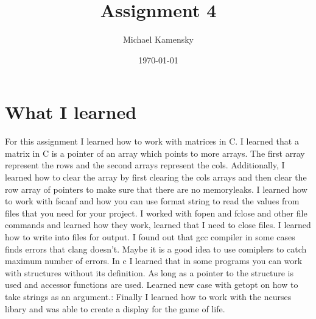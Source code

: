 \documentclass[11pt]{article} %
\title{Assignment 4}
\author{Michael Kamensky}
\date{\today} %
\begin{document}
\maketitle %
\section{What I learned}
For this assignment I learned how to work with matrices in C.
I learned that a matrix in C is a pointer of an array which points to more arrays. The first array represent the rows and the second arrays represent the cols.
Additionally, I learned how to clear the array by first clearing the cols arrays and then clear the row array of pointers to make sure that there are no memoryleaks.
I learned how to work with fscanf and how you can use format string to read the values from files that you need for your project.
I worked with fopen and fclose and other file commands and learned how they work, learned that I need to close files.
I learned how to write into files for output.
I found out that gcc compiler in some cases finds errors that clang doesn't. Maybe it is a good idea to use comiplers to catch maximum number of errors.
In c I learned that in some programs you can work with structures without its definition. As long as a pointer to the structure is used and accessor functions are used.
Learned new case with getopt on how to take strings as an argument.:
Finally I learned how to work with the ncurses libary and was able to create a display for the game of life.
\end{document}
